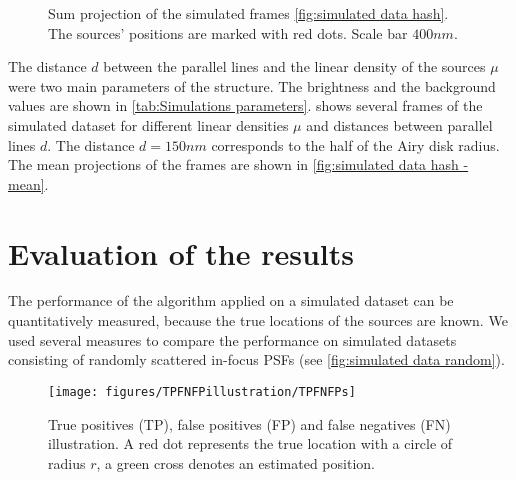 \begin{figure}[!htb]	
	\newcommand{\widthfig}{.3\textwidth}	
	\centering	
	\hspace{.3cm}		
	\hspace{.3cm}	
	\caption{Sum projection of the simulated frames \autoref{fig:simulated data hash}. The sources' positions are marked with red dots. Scale bar $400 \unit{nm}$.}
	\label{fig:simulated data hash - mean}
\end{figure} 
%
The distance $d$ between the parallel lines and the linear density of the sources $\mu$ were two main parameters of the structure. The brightness and the background values are shown in \autoref{tab:Simulations parameters}.  shows several frames of the simulated dataset for different linear densities $\mu$ and distances between parallel lines $d$. The distance $d=150\unit{nm}$ corresponds to the half of the Airy disk radius. The mean projections of the frames are shown in \autoref{fig:simulated data hash - mean}.  


\clearpage
\section{Evaluation of the results\label{sec:evaluation}}

The performance of the algorithm applied on a simulated dataset can be quantitatively measured, because the true locations of the sources are known. We used several measures to compare the performance on simulated datasets consisting of randomly scattered in-focus PSFs (see \autoref{fig:simulated data random}). 

\begin{figure}[!h]
	\centering
	\texttt{[image: figures/TPFNFPillustration/TPFNFPs]}
	\caption{True positives (TP), false positives (FP) and false negatives (FN) illustration. A red dot represents the true location with a circle of radius $r$, a green cross denotes an estimated position.}
	\label{fig:TPFPFN}
\end{figure}


